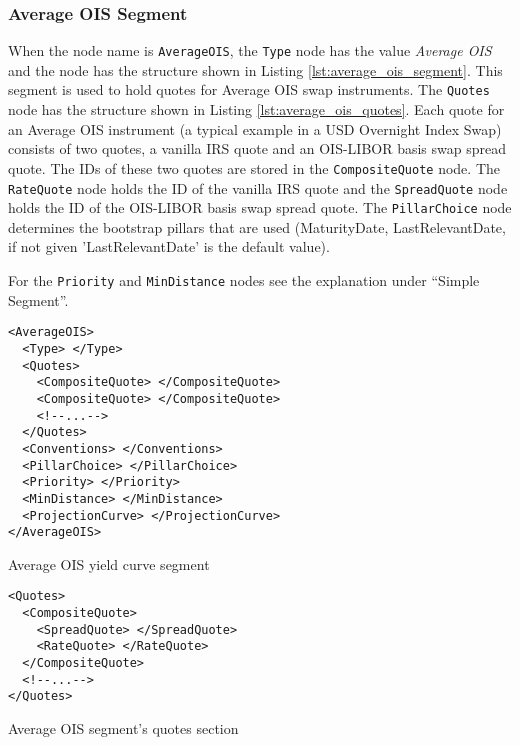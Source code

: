 \subsubsection*{Average OIS Segment}
When the node name is \lstinline!AverageOIS!, the \lstinline!Type! node has the value \emph{Average OIS} and the node
has the structure shown in Listing \ref{lst:average_ois_segment}. This segment is used to hold quotes for Average OIS
swap instruments. The \lstinline!Quotes! node has the structure shown in Listing \ref{lst:average_ois_quotes}. Each
quote for an Average OIS instrument (a typical example in a USD Overnight Index Swap) consists of two quotes, a vanilla
IRS quote and an OIS-LIBOR basis swap spread quote.  The IDs of these two quotes are stored in the
\lstinline!CompositeQuote! node. The \lstinline!RateQuote! node holds the ID of the vanilla IRS quote and the
\lstinline!SpreadQuote! node holds the ID of the OIS-LIBOR basis swap spread quote. The \lstinline!PillarChoice! node
determines the bootstrap pillars that are used (MaturityDate, LastRelevantDate, if not given 'LastRelevantDate' is the
default value).

For the \lstinline!Priority! and \lstinline!MinDistance! nodes see the explanation under ``Simple Segment''.

\begin{listing}[H]
\begin{verbatim}
<AverageOIS>
  <Type> </Type>
  <Quotes>
    <CompositeQuote> </CompositeQuote>
    <CompositeQuote> </CompositeQuote>
    <!--...-->
  </Quotes>
  <Conventions> </Conventions>
  <PillarChoice> </PillarChoice>
  <Priority> </Priority>
  <MinDistance> </MinDistance>
  <ProjectionCurve> </ProjectionCurve>
</AverageOIS>
\end{verbatim}
\caption{Average OIS yield curve segment}
\label{lst:average_ois_segment}
\end{listing}

\begin{listing}[H]
\begin{verbatim}
<Quotes>
  <CompositeQuote>
    <SpreadQuote> </SpreadQuote>
    <RateQuote> </RateQuote>
  </CompositeQuote>
  <!--...-->
</Quotes>
\end{verbatim}
\caption{Average OIS segment's quotes section}
\label{lst:average_ois_quotes}
\end{listing}


